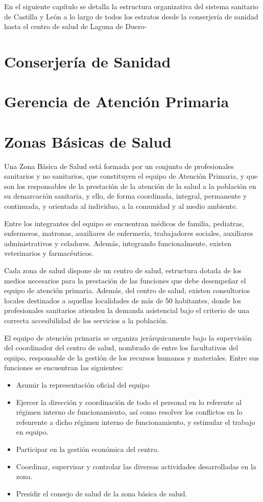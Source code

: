 En el siguiente capítulo se detalla la estructura organizativa del sistema sanitario de Castilla y León a lo largo de todos los estratos desde la conserjería de sanidad hasta el centro de salud de Laguna de Duero-

\section{Conserjería de Sanidad}

\section{Gerencia de Atención Primaria}

\section{Zonas Básicas de Salud}

Una Zona Básica de Salud está formada por un conjunto de profesionales sanitarios y no sanitarios, que constituyen el equipo de Atención Primaria, y que son los responsables de la prestación de la atención de la salud a la población en su demarcación sanitaria, y ello, de forma coordinada, integral, permanente y continuada, y orientada al individuo, a la comunidad y al medio ambiente.

Entre los integrantes del equipo se encuentran médicos de familia, pediatras, enfermeros, matronas, auxiliares de enfermería, trabajadores sociales, auxiliares administrativos y celadores. Además, integrando funcionalmente, existen veterinarios y farmacéuticos.

Cada zona de salud dispone de un centro de salud, estructura dotada de los medios necesarios para la prestación de las funciones que debe desempeñar el equipo de atención primaria. Además, del centro de salud, existen consultorios locales destinados a aquellas localidades de más de 50 habitantes, donde los profesionales sanitarios atienden la demanda asistencial bajo el criterio de una correcta accesibilidad de los servicios a la población.

El equipo de atención primaria se organiza jerárquicamente bajo la supervisión del coordinador del centro de salud, nombrado de entre los facultativos del equipo, responsable de la gestión de los recursos humanos y materiales. Entre sus funciones se encuentran las siguientes:

\begin{itemize}
    \item Asumir la representación oficial del equipo
    \item Ejercer la dirección y coordinación de todo el personal en lo referente al régimen interno de funcionamiento, así como resolver los conflictos en lo refenrente a dicho régimen interno de funcionamiento, y estimular el trabajo en equipo.
    \item Participar en la gestión económica del centro.
    \item Coordinar, supervisar y controlar las diversas actividades desarrolladas en la zona.
    \item Presidir el consejo de salud de la zona básica de salud.
\end{itemize}

